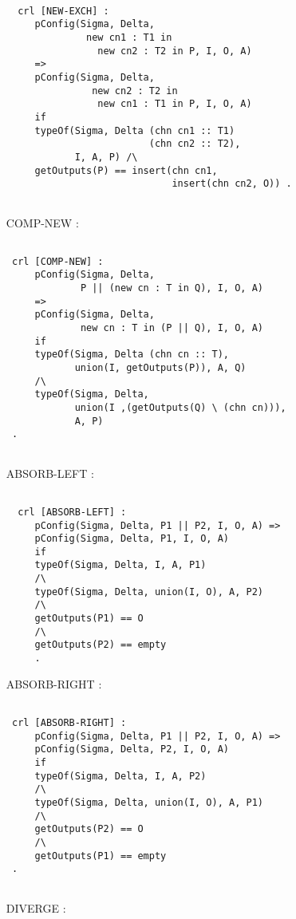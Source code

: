 \documentclass{article}
\begin{document}
\begin{itemize}
\begin{lstlisting}
  
  crl [NEW-EXCH] :
     pConfig(Sigma, Delta, 
              new cn1 : T1 in 
                new cn2 : T2 in P, I, O, A) 
     => 
     pConfig(Sigma, Delta, 
               new cn2 : T2 in 
                new cn1 : T1 in P, I, O, A)
     if
     typeOf(Sigma, Delta (chn cn1 :: T1) 
                         (chn cn2 :: T2), 
            I, A, P) /\
     getOutputs(P) == insert(chn cn1, 
                             insert(chn cn2, O)) .
                             
     \end{lstlisting} 
\item[COMP-NEW]:
\begin{lstlisting}                             

 crl [COMP-NEW] :
     pConfig(Sigma, Delta, 
             P || (new cn : T in Q), I, O, A)
     =>  
     pConfig(Sigma, Delta, 
             new cn : T in (P || Q), I, O, A)
     if
     typeOf(Sigma, Delta (chn cn :: T), 
            union(I, getOutputs(P)), A, Q)
     /\
     typeOf(Sigma, Delta, 
            union(I ,(getOutputs(Q) \ (chn cn))), 
            A, P) 
 .
 
     \end{lstlisting} 
\item[ABSORB-LEFT]:
\begin{lstlisting} 

  crl [ABSORB-LEFT] : 
     pConfig(Sigma, Delta, P1 || P2, I, O, A) =>
     pConfig(Sigma, Delta, P1, I, O, A) 
     if
     typeOf(Sigma, Delta, I, A, P1) 
     /\
     typeOf(Sigma, Delta, union(I, O), A, P2) 
     /\
     getOutputs(P1) == O
     /\ 
     getOutputs(P2) == empty
     .
      \end{lstlisting} 
\item[ABSORB-RIGHT]:
\begin{lstlisting}            
 
 crl [ABSORB-RIGHT] : 
     pConfig(Sigma, Delta, P1 || P2, I, O, A) =>
     pConfig(Sigma, Delta, P2, I, O, A) 
     if
     typeOf(Sigma, Delta, I, A, P2) 
     /\
     typeOf(Sigma, Delta, union(I, O), A, P1) 
     /\
     getOutputs(P2) == O
     /\ 
     getOutputs(P1) == empty 
 .
 
     \end{lstlisting} 
     
\item[DIVERGE]:
\begin{lstlisting}  
 

\end{lstlisting}
\end{itemize}
\end{document}
